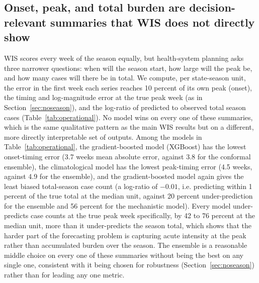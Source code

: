 \documentclass[11pt]{article}
\begin{document}
\subsection{Onset, peak, and total burden are decision-relevant summaries that WIS does not
directly show}\label{sec:operational}
WIS scores every week of the season equally, but health-system planning asks three narrower
questions: when will the season start, how large will the peak be, and how many cases will there
be in total. We compute, per state-season unit, the error in the first week each series reaches 10
percent of its own peak (onset), the timing and log-magnitude error at the true peak week (as in
Section~\ref{sec:noseason}), and the log-ratio of predicted to observed total season cases
(Table~\ref{tab:operational}). No model wins on every one of these summaries, which is the same
qualitative pattern as the main WIS results but on a different, more directly interpretable set of
outputs. Among the models in Table~\ref{tab:operational}, the gradient-boosted model (XGBoost) has the lowest onset-timing error (3.7 weeks mean
absolute
error, against 3.8 for the conformal ensemble), the climatological model has the lowest peak-timing
error (4.5 weeks, against 4.9 for the ensemble), and the gradient-boosted model again gives the
least biased total-season case count (a log-ratio of $-0.01$, i.e. predicting within 1 percent of
the true total at the median unit, against 20
percent under-prediction for the ensemble and 56 percent for the mechanistic model). Every model under-predicts case
counts at the true peak week specifically, by 42 to 76 percent at the median unit, more than it
under-predicts the season total, which shows that the harder part of the forecasting problem is
capturing acute intensity at the peak rather than accumulated burden over the season. The ensemble
is a reasonable middle choice on every one of these summaries without being the best on any single
one, consistent with it being chosen for robustness (Section~\ref{sec:noseason}) rather than for
leading any one metric.
\end{document}

